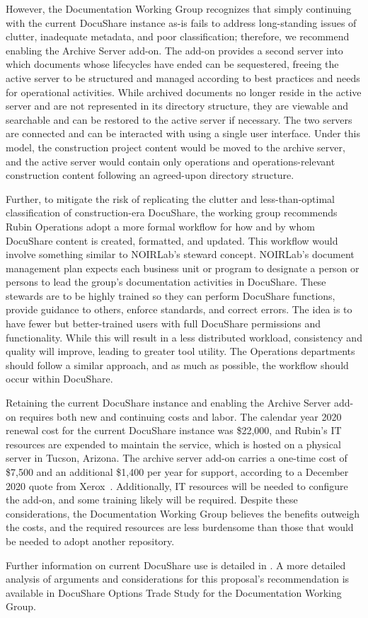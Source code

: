 However, the Documentation Working Group recognizes that simply continuing with the current DocuShare instance as-is fails to address long-standing issues of clutter, inadequate metadata, and poor classification;
therefore, we recommend enabling the Archive Server add-on.
The add-on provides a second server into which documents whose lifecycles have ended can be sequestered, freeing the active server to be structured and managed according to best practices and needs for operational activities.
While archived documents no longer reside in the active server and are not represented in its directory structure, they are viewable and searchable and can be restored to the active server if necessary.
The two servers are connected and can be interacted with using a single user interface.
Under this model, the construction project content would be moved to the archive server, and the active server would contain only operations and operations-relevant construction content following an agreed-upon directory structure.

Further, to mitigate the risk of replicating the clutter and less-than-optimal classification of construction-era DocuShare, the working group recommends Rubin Operations adopt a more formal workflow for how and by whom DocuShare content is created, formatted, and updated.
This workflow would involve something similar to NOIRLab’s steward concept.
NOIRLab’s document management plan expects each business unit or program to designate a person or persons to lead the group’s documentation activities in DocuShare.
These stewards are to be highly trained so they can perform DocuShare functions, provide guidance to others, enforce standards, and correct errors.
The idea is to have fewer but better-trained users with full DocuShare permissions and functionality.
While this will result in a less distributed workload, consistency and quality will improve, leading to greater tool utility.
The Operations departments should follow a similar approach, and as much as possible, the workflow should occur within DocuShare.

Retaining the current DocuShare instance and enabling the Archive Server add-on requires both new and continuing costs and labor.
The calendar year 2020 renewal cost for the current DocuShare instance was \$22,000, and Rubin's IT resources are expended to maintain the service, which is hosted on a physical server in Tucson, Arizona.
The archive server add-on carries a one-time cost of \$7,500 and an additional \$1,400 per year for support, according to a December 
2020 quote from Xerox\textregistered\ .
Additionally, IT resources will be needed to configure the add-on, and some training likely will be required.
Despite these considerations, the Documentation Working Group believes the benefits outweigh the costs, and the required resources are less burdensome than those that would be needed to adopt another repository.

Further information on current DocuShare use is detailed in .
A more detailed analysis of arguments and considerations for this proposal's recommendation is available in DocuShare Options Trade Study for the Documentation Working Group. 
